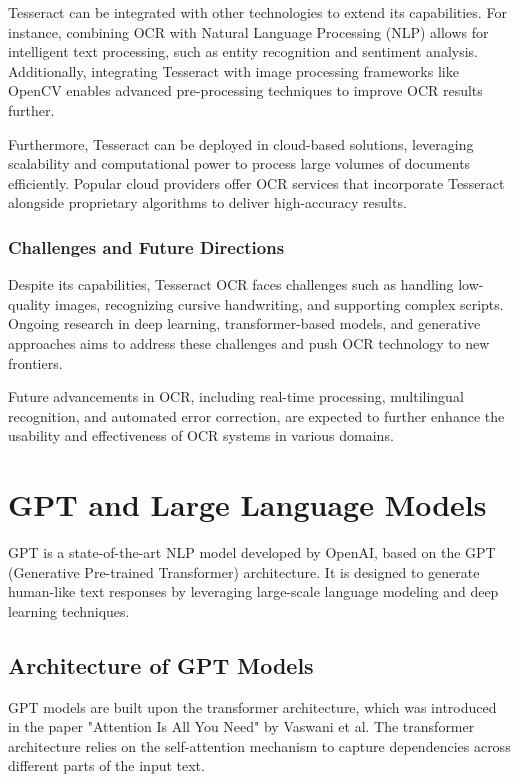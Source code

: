 Tesseract can be integrated with other technologies to extend its capabilities. For instance, combining OCR with Natural Language Processing (NLP) allows for intelligent text processing, such as entity recognition and sentiment analysis. Additionally, integrating Tesseract with image processing frameworks like OpenCV enables advanced pre-processing techniques to improve OCR results further.

Furthermore, Tesseract can be deployed in cloud-based solutions, leveraging scalability and computational power to process large volumes of documents efficiently. Popular cloud providers offer OCR services that incorporate Tesseract alongside proprietary algorithms to deliver high-accuracy results.

\subsubsection{Challenges and Future Directions}

Despite its capabilities, Tesseract OCR faces challenges such as handling low-quality images, recognizing cursive handwriting, and supporting complex scripts. Ongoing research in deep learning, transformer-based models, and generative approaches aims to address these challenges and push OCR technology to new frontiers.

Future advancements in OCR, including real-time processing, multilingual recognition, and automated error correction, are expected to further enhance the usability and effectiveness of OCR systems in various domains.





\section{GPT and Large Language Models}

GPT is a state-of-the-art NLP model developed by OpenAI, based on the GPT (Generative Pre-trained Transformer) architecture. It is designed to generate human-like text responses by leveraging large-scale language modeling and deep learning techniques.

\subsection{Architecture of GPT Models}

GPT models are built upon the transformer architecture, which was introduced in the paper "Attention Is All You Need" by Vaswani et al. The transformer architecture relies on the self-attention mechanism to capture dependencies across different parts of the input text.


